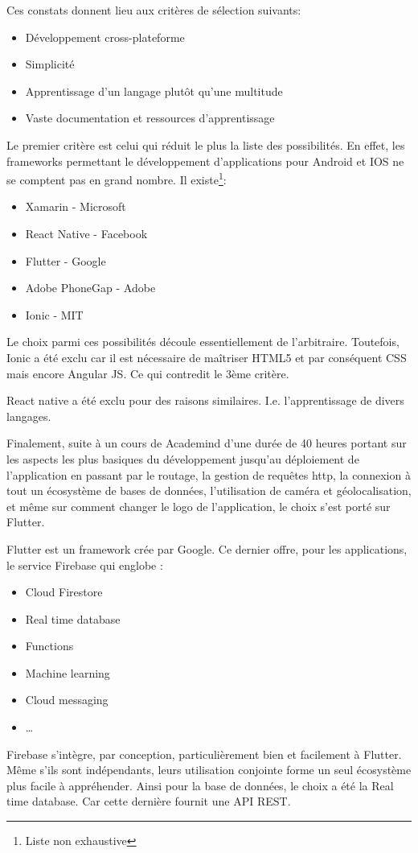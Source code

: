     Ces constats donnent lieu aux critères de sélection suivants:
    \smallskip
    \begin{itemize}
        \item Développement cross-plateforme
        \item Simplicité
        \item Apprentissage d'un langage plutôt qu'une multitude
        \item Vaste documentation et ressources d'apprentissage
    \end{itemize}
    \smallskip
    Le premier critère est celui qui réduit le plus la liste des possibilités. En effet, les frameworks 
    permettant le développement d'applications pour Android et IOS ne se comptent pas en grand nombre. Il existe\footnote{Liste non exhaustive}:
    \smallskip
    \begin{itemize}
        \item Xamarin - Microsoft
        \item React Native - Facebook
        \item Flutter - Google
        \item Adobe PhoneGap - Adobe
        \item Ionic - MIT
    \end{itemize}
    \smallskip
    Le choix parmi ces possibilités découle essentiellement de l'arbitraire. Toutefois, Ionic a été exclu
    car il est nécessaire de maîtriser HTML5 et par conséquent CSS mais encore Angular JS. Ce qui contredit le 3ème critère.

    React native a été exclu pour des raisons similaires. I.e. l'apprentissage de divers langages.

    Finalement, suite à un cours de Academind d'une durée de 40 heures portant sur les aspects les
    plus basiques du développement jusqu'au déploiement de l'application en passant par le routage, la gestion de requêtes http,
    la connexion à tout un écosystème de bases de données, l'utilisation de caméra et géolocalisation, et même sur 
    comment changer le logo de l'application, le choix s'est porté sur Flutter.

    Flutter est un framework crée par Google. Ce dernier offre, pour les applications, le service Firebase qui englobe :
    \smallskip
    \begin{itemize}
        \item Cloud Firestore
        \item Real time database
        \item Functions
        \item Machine learning
        \item Cloud messaging
        \item \dots
    \end{itemize}
    \smallskip
    Firebase s'intègre, par conception, particulièrement bien et facilement à Flutter. Même s'ils sont
    indépendants, leurs utilisation conjointe forme un seul écosystème plus facile à appréhender. Ainsi pour la 
    base de données, le choix a été la Real time database. Car cette dernière fournit une API REST.


